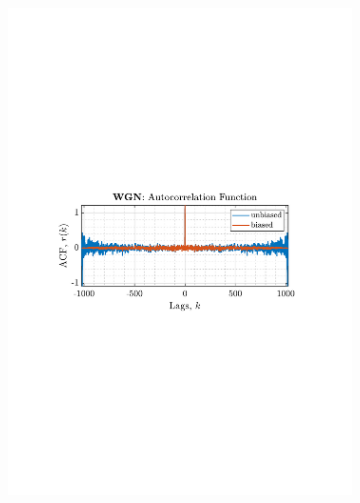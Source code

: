 \documentclass[12pt]{article}
\begin{document}
\begin{figure}[H]
\begin{subfigure}{0.49\textwidth}
			\includegraphics[trim={2.2cm 11.2cm 3.15cm  11.2cm}, clip, width=\textwidth]{../MATLAB/figures/q1_3a_fig02.pdf} 
		\end{subfigure}
		\begin{subfigure}{0.49\textwidth}
			\centering

\end{subfigure}
\end{figure}
\end{document}

